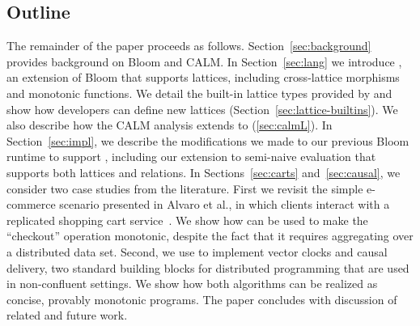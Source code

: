 \subsection{Outline}
The remainder of the paper proceeds as follows.  Section~\ref{sec:background} provides background on Bloom and CALM.  In Section~\ref{sec:lang} we introduce \lang, an extension of Bloom that supports lattices, including cross-lattice morphisms and monotonic functions. We detail the built-in lattice types provided by \lang and show how developers can define new lattices (Section~\ref{sec:lattice-builtins}).  We also describe how the CALM analysis extends to \lang (\ref{sec:calmL}).  In Section~\ref{sec:impl}, we describe the modifications we made to our previous Bloom runtime to support \lang, including our extension to semi-naive evaluation that supports both lattices and relations.  In Sections~\ref{sec:carts} and~\ref{sec:causal}, we consider two case studies from the literature.  
First we revisit the simple e-commerce scenario presented in Alvaro et al., in
which clients interact with a replicated shopping cart
service~\cite{Alvaro2011}. We show how \lang can be used to make the
``checkout'' operation monotonic, despite the fact that it requires
aggregating over a distributed data set.
Second, we use \lang to implement vector clocks and causal delivery, two
standard building blocks for distributed programming that are used in non-confluent settings. We show how both
algorithms can be realized as concise, provably monotonic \lang programs.
The paper concludes with discussion of related and future work.

